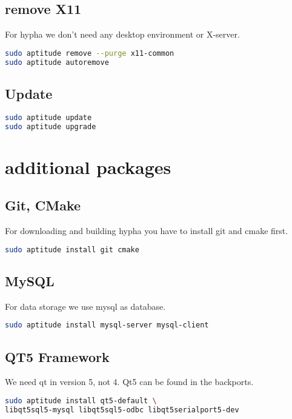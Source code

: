 \documentclass[a4paper,11pt]{report}
\begin{document}
\subsection{remove X11}
For hypha we don't need any desktop environment or X-server.
\begin{lstlisting}[language=bash,caption={remove x11}]
sudo aptitude remove --purge x11-common
sudo aptitude autoremove
\end{lstlisting}


\subsection{Update}

\begin{lstlisting}[language=bash,caption={update}]
sudo aptitude update
sudo aptitude upgrade
\end{lstlisting}

\section{additional packages}
\subsection{Git, CMake}
For downloading and building hypha you have to install git and cmake first.

\begin{lstlisting}[language=bash,caption={install git, cmake}]
sudo aptitude install git cmake
\end{lstlisting}

\subsection{MySQL}
For data storage we use mysql as database.

\begin{lstlisting}[language=bash,caption={install mysql}]
sudo aptitude install mysql-server mysql-client
\end{lstlisting}

\subsection{QT5 Framework}
We need qt in version 5, not 4. Qt5 can be found in the backports.
\begin{lstlisting}[language=bash,caption={install qt5}]
sudo aptitude install qt5-default \
libqt5sql5-mysql libqt5sql5-odbc libqt5serialport5-dev
\end{lstlisting}
\end{document}
